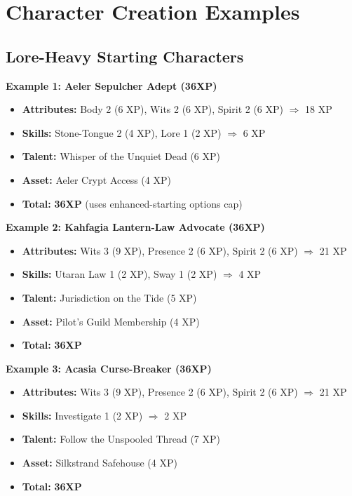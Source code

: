 \section{Character Creation Examples}\label{sec:creation_examples}

\subsection{Lore-Heavy Starting Characters}\label{subsec:starting_examples}

\textbf{Example 1: Aeler Sepulcher Adept (36XP)}
\begin{itemize}
    \item \textbf{Attributes:} Body 2 (6 XP), Wits 2 (6 XP), Spirit 2 (6 XP) $\Rightarrow$ 18 XP
    \item \textbf{Skills:} Stone-Tongue 2 (4 XP), Lore 1 (2 XP) $\Rightarrow$ 6 XP
    \item \textbf{Talent:} Whisper of the Unquiet Dead (6 XP)
    \item \textbf{Asset:} Aeler Crypt Access (4 XP)
    \item \textbf{Total:} \textbf{36XP} (uses enhanced-starting options cap)
\end{itemize}

\textbf{Example 2: Kahfagia Lantern-Law Advocate (36XP)}
\begin{itemize}
    \item \textbf{Attributes:} Wits 3 (9 XP), Presence 2 (6 XP), Spirit 2 (6 XP) $\Rightarrow$ 21 XP
    \item \textbf{Skills:} Utaran Law 1 (2 XP), Sway 1 (2 XP) $\Rightarrow$ 4 XP
    \item \textbf{Talent:} Jurisdiction on the Tide (5 XP)
    \item \textbf{Asset:} Pilot's Guild Membership (4 XP)
    \item \textbf{Total:} \textbf{36XP}
\end{itemize}

\textbf{Example 3: Acasia Curse-Breaker (36XP)}
\begin{itemize}
    \item \textbf{Attributes:} Wits 3 (9 XP), Presence 2 (6 XP), Spirit 2 (6 XP) $\Rightarrow$ 21 XP
    \item \textbf{Skills:} Investigate 1 (2 XP) $\Rightarrow$ 2 XP
    \item \textbf{Talent:} Follow the Unspooled Thread (7 XP)
    \item \textbf{Asset:} Silkstrand Safehouse (4 XP)
    \item \textbf{Total:} \textbf{36XP}
\end{itemize}

